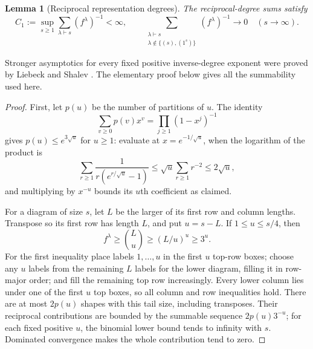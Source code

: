 \documentclass[11pt]{article}
\newtheorem{lemma}[theorem]{Lemma}
\theoremstyle{remark}
\numberwithin{equation}{section}
\begin{document}
\begin{lemma}[Reciprocal representation degrees]\label{lem:reciprocal-degrees}
The reciprocal-degree sums satisfy
\begin{equation}\label{eq:h-9}
 C_1:=\sup_{s\ge1}\sum_{\lambda\vdash s}(f^\lambda)^{-1}<\infty,
 \qquad
 \sum_{\substack{\lambda\vdash s\\\lambda\notin\{(s),(1^s)\}}}(f^\lambda)^{-1}\longrightarrow0\quad(s\to\infty).
\end{equation}
\end{lemma}
Stronger asymptotics for every fixed positive inverse-degree exponent
were proved by Liebeck and Shalev \cite[Theorem~2.6]{liebeck-shalev2004}.
The elementary proof below gives all the summability used here.
\begin{proof}

First, let \(p(u)\) be the number of partitions of \(u\). The identity
\[
 \sum_{v\ge0}p(v)x^v=\prod_{j\ge1}(1-x^j)^{-1}
\]
gives \(p(u)\le e^{3\sqrt u}\) for \(u\ge1\): evaluate at \(x=e^{-1/\sqrt u}\), when the logarithm of the product is
\[
 \sum_{r\ge1}\frac1{r(e^{r/\sqrt u}-1)}
 \le\sqrt u\sum_{r\ge1}r^{-2}\le2\sqrt u,
\]
and multiplying by \(x^{-u}\) bounds its \(u\)th coefficient as claimed.

For a diagram of size \(s\), let \(L\) be the larger of its first row and column lengths. Transpose so its first row has length \(L\), and put \(u=s-L\). If \(1\le u\le s/4\), then
\[
 f^\lambda\ge \binom Lu\ge(L/u)^u\ge3^u.
\]
For the first inequality place labels \(1,\ldots,u\) in the first \(u\) top-row boxes; choose any \(u\) labels from the remaining \(L\) labels for the lower diagram, filling it in row-major order; and fill the remaining top row increasingly. Every lower column lies under one of the first \(u\) top boxes, so all column and row inequalities hold. There are at most \(2p(u)\) shapes with this tail size, including transposes. Their reciprocal contributions are bounded by the summable sequence \(2p(u)3^{-u}\); for each fixed positive \(u\), the binomial lower bound tends to infinity with \(s\). Dominated convergence makes the whole contribution tend to zero.


\end{proof}
\end{document}
